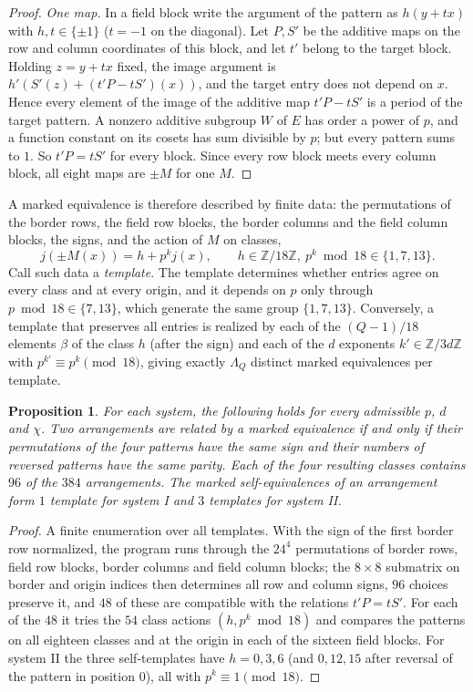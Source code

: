 \documentclass[11pt]{article}
\theoremstyle{plain}
\newtheorem{proposition}[theorem]{Proposition}
\theoremstyle{definition}
\theoremstyle{remark}
\newcommand{\Z}{\mathbb Z}
\begin{document}
\begin{proof}
\emph{One map.} In a field block write the argument of the pattern as
$h(y+tx)$ with $h,t\in\{\pm1\}$ ($t=-1$ on the diagonal). Let $P,S'$ be the
additive maps on the row and column coordinates of this block, and let $t'$
belong to the target block. Holding $z=y+tx$ fixed, the image argument is
$h'(S'(z)+(t'P-tS')(x))$, and the target entry does not depend on $x$.
Hence every element of the image of the additive map $t'P-tS'$ is a period of
the target pattern. A nonzero additive subgroup $W$ of $E$ has order a power
of $p$, and a function constant on its cosets has sum divisible by $p$; but
every pattern sums to $1$. So $t'P=tS'$ for every block. Since every row
block meets every column block, all eight maps are $\pm M$ for one $M$.
\end{proof}

A marked equivalence is therefore described by finite data: the
permutations of the border rows, the field row blocks, the border columns and
the field column blocks, the signs, and the action of $M$ on classes,
\[
j(\pm M(x))=h+p^kj(x),\qquad h\in\Z/18\Z,\ p^k\bmod18\in\{1,7,13\}.
\]
Call such data a \emph{template}. The template determines whether entries
agree on every class and at every origin, and it depends on $p$ only through
$p\bmod18\in\{7,13\}$, which generate the same group $\{1,7,13\}$.
Conversely, a template that preserves all entries is realized by each of the
$(Q-1)/18$ elements $\beta$ of the class $h$ (after the sign) and each of the
$d$ exponents $k'\in\Z/3d\Z$ with $p^{k'}\equiv p^k\pmod{18}$, giving
exactly $\Lambda_Q$ distinct marked equivalences per template.

\begin{proposition}\label{prop:transport}
For each system, the following holds for every admissible $p$, $d$ and
$\chi$. Two arrangements are related by a marked equivalence if and only if
their permutations of the four patterns have the same sign and their numbers
of reversed patterns have the same parity. Each of the four resulting classes
contains $96$ of the $384$ arrangements. The marked self-equivalences of an
arrangement form $1$ template for system I and $3$ templates for system II.
\end{proposition}

\begin{proof}
A finite enumeration over all templates. With the sign of the first border
row normalized, the program runs through the $24^4$ permutations of border
rows, field row blocks, border columns and field column blocks; the
$8\times8$ submatrix on border and origin indices then determines all row and
column signs, $96$ choices preserve it, and $48$ of these are compatible with
the relations $t'P=tS'$. For each of the $48$ it tries the $54$ class actions
$(h,p^k\bmod18)$ and compares the patterns on all eighteen classes and at the
origin in each of the sixteen field blocks. For system II the three
self-templates have $h=0,3,6$ (and $0,12,15$ after reversal of the pattern
in position $0$), all with $p^k\equiv1\pmod{18}$.
\end{proof}
\end{document}
